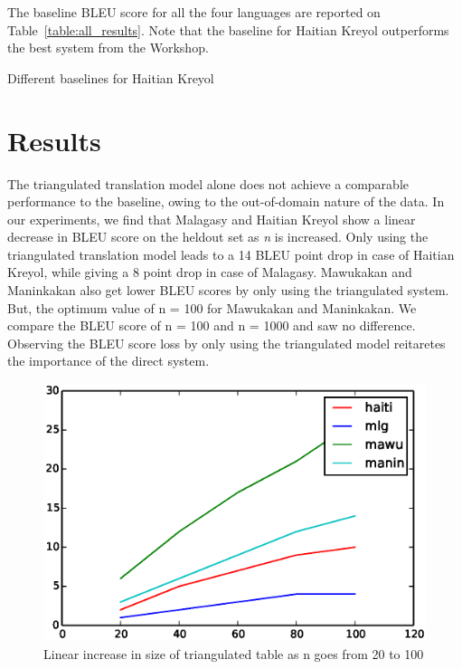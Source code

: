 The baseline BLEU score for all the four languages are reported on Table~\ref{table:all_results}. Note that the baseline for Haitian Kreyol outperforms the best system from the Workshop. 

\begin{table}
	\small
	\centering
	
	\caption{Different baselines for Haitian Kreyol}
	\label{table:haiti_baselines}
\end{table}




\section{Results}
\label{sec:results}
 The triangulated translation model alone does not achieve a comparable performance to the baseline, owing to the out-of-domain nature of the data. In our experiments, we find that Malagasy and Haitian Kreyol show a linear decrease in BLEU score on the heldout set as \emph{n} is increased. Only using the triangulated translation model leads to a 14 BLEU point drop in case of Haitian Kreyol, while giving a 8 point drop in case of Malagasy. Mawukakan and Maninkakan also get lower BLEU scores by only using the triangulated system. But, the optimum value of n = 100 for Mawukakan and Maninkakan. We compare the BLEU score of n = 100 and n = 1000 and saw no difference. Observing the BLEU score loss by only using the triangulated model reitaretes the importance of the direct system.  %
\begin{figure}[t]
                \small
                \centering
                \includegraphics[scale=0.5]{files/Figures/multiplication_factors.eps}
                \caption{Linear increase in size of triangulated table as n goes from 20 to 100}
                \label{fig:multiplication_factors}

\end{figure}


